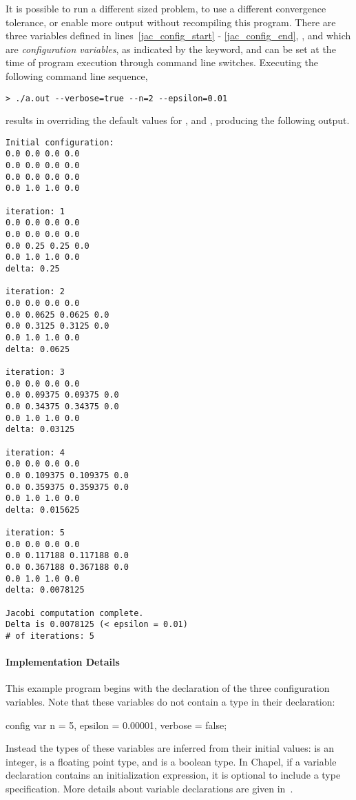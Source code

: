 It is possible to run a different sized problem, to use a different
convergence tolerance, or enable more output without recompiling this
program.  There are three variables defined in lines~\ref{jac_config_start} - 
\ref{jac_config_end}, 
,  and  which are {\em configuration variables},
as indicated by the  keyword, 
and can be set at the time of program execution through command line switches.
Executing the following command line sequence,
\small{
\begin{verbatim}
> ./a.out --verbose=true --n=2 --epsilon=0.01
\end{verbatim}}
results in overriding the default values for ,  and
, producing the following output.
\small{
\begin{verbatim}
Initial configuration:
0.0 0.0 0.0 0.0
0.0 0.0 0.0 0.0
0.0 0.0 0.0 0.0
0.0 1.0 1.0 0.0

iteration: 1
0.0 0.0 0.0 0.0
0.0 0.0 0.0 0.0
0.0 0.25 0.25 0.0
0.0 1.0 1.0 0.0
delta: 0.25

iteration: 2
0.0 0.0 0.0 0.0
0.0 0.0625 0.0625 0.0
0.0 0.3125 0.3125 0.0
0.0 1.0 1.0 0.0
delta: 0.0625

iteration: 3
0.0 0.0 0.0 0.0
0.0 0.09375 0.09375 0.0
0.0 0.34375 0.34375 0.0
0.0 1.0 1.0 0.0
delta: 0.03125

iteration: 4
0.0 0.0 0.0 0.0
0.0 0.109375 0.109375 0.0
0.0 0.359375 0.359375 0.0
0.0 1.0 1.0 0.0
delta: 0.015625

iteration: 5
0.0 0.0 0.0 0.0
0.0 0.117188 0.117188 0.0
0.0 0.367188 0.367188 0.0
0.0 1.0 1.0 0.0
delta: 0.0078125

Jacobi computation complete.
Delta is 0.0078125 (< epsilon = 0.01)
# of iterations: 5
\end{verbatim}}

\paragraph{Implementation Details}
This example program begins with the declaration of the three configuration
variables.  Note that these variables do not contain a type in their declaration: 
\begin{chapel}
config var n = 5,
           epsilon = 0.00001,
           verbose = false;
\end{chapel}
Instead the types of these variables are inferred 
from their initial values:  is an integer,  is a floating point
type, and  is a boolean type.  In Chapel, if a variable declaration
contains an initialization expression, it is optional to include a type specification.
More details about variable declarations are given in~.

